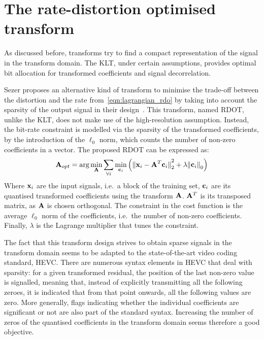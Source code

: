 \documentclass[11pt,a4paper,openright,twoside]{book}
\numberwithin{equation}{section} %
\numberwithin{figure}{section} %
\numberwithin{table}{section} %
\begin{document}
\section{The rate-distortion optimised transform}
\label{sec:rdot}

As discussed before, transforms try to find a compact representation of the
signal in the transform domain.
The \ac{KLT}, under certain assumptions, provides optimal bit allocation for
transformed coefficients and signal decorrelation.

Sezer proposes an alternative kind of transform to minimise the trade-off
between the distortion and the rate from~\eqref{eqn:lagrangian_rdo} by taking
into account the sparsity of the output signal in their
design~\cite{sezer-11-phd,sezer-08-sparse-orthonormal-transforms}.
This transform, named \ac{RDOT}, unlike the \ac{KLT}, does not make use
of the high-resolution assumption.
Instead, the bit-rate constraint is modelled via the sparsity of the
transformed coefficients, by the introduction of the $\ell_0$ norm, which
counts the number of non-zero coefficients in a vector.
The proposed \ac{RDOT} can be expressed as:
\begin{equation}
	\mathbf{A}_{opt} = \text{arg}\min\limits_{\mathbf{A}}
	\sum_{\forall i} \min\limits_{\mathbf{c}_i}
	\left(
	{\Vert \mathbf{x}_i - \mathbf{A}^T\mathbf{c}_i \Vert}_2^2 + \lambda{\Vert \mathbf{c}_i \Vert}_0
	\right)
	\label{eqn:rdot-nsep}
\end{equation}
Where $\mathbf{x}_i$ are the input signals, i.e.\ a block of the training set,
$\mathbf{c}_i$ are its quantised transformed coefficients using the transform
$\mathbf{A}$.
$\mathbf{A}^T$ is its transposed matrix, as $\mathbf{A}$ is chosen orthogonal.
The constraint in the cost function is the average $\ell_0$ norm of the
coefficients, i.e.\ the number of non-zero coefficients.
Finally, $\lambda$ is the Lagrange multiplier that tunes the constraint.

The fact that this transform design strives to obtain sparse signals in the
transform domain seems to be adapted to the state-of-the-art video coding
standard, \ac{HEVC}.
There are numerous syntax elements in \ac{HEVC} that deal with sparsity:
for a given transformed residual, the position of the last non-zero value is
signalled, meaning that, instead of explicitly transmitting all the following
zeroes, it is indicated that from that point onwards, all the following values
are zero.
More generally, flags indicating whether the individual coefficients are
significant or not are also part of the standard syntax.
Increasing the number of zeros of the quantised coefficients in the transform
domain seems therefore a good objective.
\end{document}
